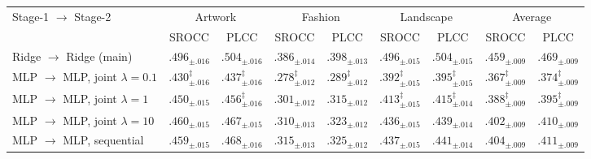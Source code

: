 \begin{tabular}{@{}l cc cc cc cc@{}}
  \toprule
  \multirow{2}{*}{Stage-1 $\to$ Stage-2} & \multicolumn{2}{c}{Artwork} & \multicolumn{2}{c}{Fashion} & \multicolumn{2}{c}{Landscape} & \multicolumn{2}{c}{Average} \\
  \cmidrule(lr){2-3}\cmidrule(lr){4-5}\cmidrule(lr){6-7}\cmidrule(lr){8-9}
   & SROCC & PLCC & SROCC & PLCC & SROCC & PLCC & SROCC & PLCC \\
  \midrule
  Ridge $\to$ Ridge (main) & $\bm{.496_{\pm .016}}$ & $\bm{.504_{\pm .016}}$ & $\bm{.386_{\pm .014}}$ & $\bm{.398_{\pm .013}}$ & $\bm{.496_{\pm .015}}$ & $\bm{.504_{\pm .015}}$ & $\bm{.459_{\pm .009}}$ & $\bm{.469_{\pm .009}}$ \\
  \addlinespace
  MLP $\to$ MLP, joint $\lambda=0.1$ & $.430_{\pm .016}^\ddagger$ & $.437_{\pm .016}^\ddagger$ & $.278_{\pm .012}^\ddagger$ & $.289_{\pm .012}^\ddagger$ & $.392_{\pm .015}^\ddagger$ & $.395_{\pm .015}^\ddagger$ & $.367_{\pm .009}^\ddagger$ & $.374_{\pm .009}^\ddagger$ \\
  MLP $\to$ MLP, joint $\lambda=1$ & $.450_{\pm .015}$ & $.456_{\pm .016}^\ddagger$ & $.301_{\pm .012}$ & $.315_{\pm .012}$ & $.413_{\pm .015}^\ddagger$ & $.415_{\pm .014}^\ddagger$ & $.388_{\pm .009}^\ddagger$ & $.395_{\pm .009}^\ddagger$ \\
  MLP $\to$ MLP, joint $\lambda=10$ & $.460_{\pm .015}$ & $.467_{\pm .015}$ & $.310_{\pm .013}$ & $.323_{\pm .012}$ & $.436_{\pm .015}$ & $.439_{\pm .014}$ & $.402_{\pm .009}$ & $.410_{\pm .009}$ \\
  \addlinespace
  MLP $\to$ MLP, sequential & $.459_{\pm .015}$ & $.468_{\pm .016}$ & $.315_{\pm .013}$ & $.325_{\pm .012}$ & $.437_{\pm .015}$ & $.441_{\pm .014}$ & $.404_{\pm .009}$ & $.411_{\pm .009}$ \\
  \bottomrule
\end{tabular}

